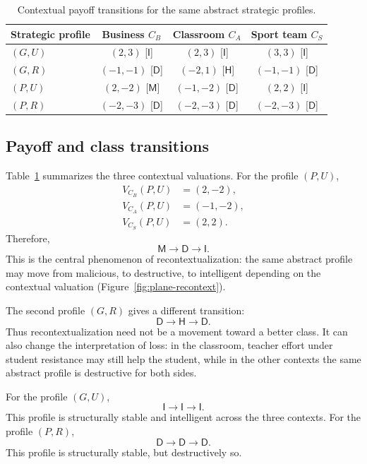\documentclass[a4paper,fleqn]{cas-dc}
\theoremstyle{remark}
\newcommand{\Iclass}{\mathsf{I}}
\newcommand{\Hclass}{\mathsf{H}}
\newcommand{\Mclass}{\mathsf{M}}
\newcommand{\Dclass}{\mathsf{D}}
\begin{document}
\begin{table}[t]
\centering
\small
\begin{tabular}{lccc}
\toprule
Strategic profile & Business $C_B$ & Classroom $C_A$ & Sport team $C_S$\\
\midrule
$(G,U)$ & $(2,3)$ [$\Iclass$] & $(2,3)$ [$\Iclass$] & $(3,3)$ [$\Iclass$]\\
$(G,R)$ & $(-1,-1)$ [$\Dclass$] & $(-2,1)$ [$\Hclass$] & $(-1,-1)$ [$\Dclass$]\\
$(P,U)$ & $(2,-2)$ [$\Mclass$] & $(-1,-2)$ [$\Dclass$] & $(2,2)$ [$\Iclass$]\\
$(P,R)$ & $(-2,-3)$ [$\Dclass$] & $(-2,-3)$ [$\Dclass$] & $(-2,-3)$ [$\Dclass$]\\
\bottomrule
\end{tabular}
\caption{Contextual payoff transitions for the same abstract strategic profiles.}
\label{tab:payoff-transitions}
\end{table}

\subsection{Payoff and class transitions}

Table~\ref{tab:payoff-transitions} summarizes the three contextual valuations. For the profile $(P,U)$,
\[
\begin{aligned}
V_{C_B}(P,U)&=(2,-2),\\
V_{C_A}(P,U)&=(-1,-2),\\
V_{C_S}(P,U)&=(2,2).
\end{aligned}
\]
Therefore,
\[
\Mclass\longrightarrow \Dclass\longrightarrow \Iclass.
\]
This is the central phenomenon of recontextualization: the same abstract profile may move from malicious, to destructive, to intelligent depending on the contextual valuation (Figure~\ref{fig:plane-recontext}).

The second profile $(G,R)$ gives a different transition:
\[
\Dclass\longrightarrow \Hclass\longrightarrow \Dclass.
\]
Thus recontextualization need not be a movement toward a better class. It can also change the interpretation of loss: in the classroom, teacher effort under student resistance may still help the student, while in the other contexts the same abstract profile is destructive for both sides.

For the profile $(G,U)$,
\[
\Iclass\longrightarrow \Iclass\longrightarrow \Iclass.
\]
This profile is structurally stable and intelligent across the three contexts. For the profile $(P,R)$,
\[
\Dclass\longrightarrow \Dclass\longrightarrow \Dclass.
\]
This profile is structurally stable, but destructively so.
\end{document}
